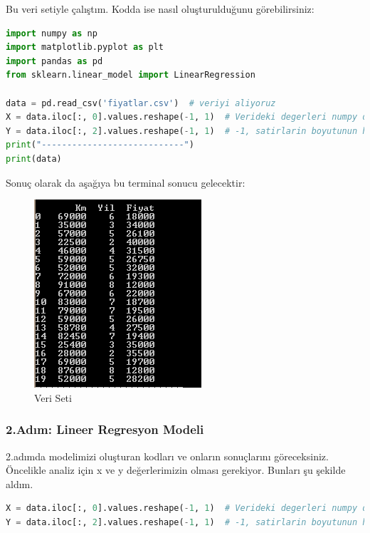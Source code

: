 \documentclass{article}
\begin{document}
\newpage

Bu veri setiyle çalıştım. Kodda ise nasıl oluşturulduğunu görebilirsiniz:

\begin{lstlisting}[language=Python, caption=Veri Seti Oluşturma]
import numpy as np
import matplotlib.pyplot as plt 
import pandas as pd
from sklearn.linear_model import LinearRegression

data = pd.read_csv('fiyatlar.csv')  # veriyi aliyoruz
X = data.iloc[:, 0].values.reshape(-1, 1)  # Verideki degerleri numpy dizisine donduruyoruz
Y = data.iloc[:, 2].values.reshape(-1, 1)  # -1, satirlarin boyutunun hesaplandigi, ancak 1 sutun oldugu anlamina gelir
print("----------------------------")
print(data)
\end{lstlisting}
Sonuç olarak da aşağıya bu terminal sonucu gelecektir:
\begin{figure}[htp]
    \centering
    \includegraphics{liR_1.png}
    \caption{Veri Seti}
    \label{fig:my_label}
\end{figure}

\subsubsection{2.Adım: Lineer Regresyon Modeli}
\hspace{1cm}2.adımda modelimizi oluşturan kodları  ve onların sonuçlarını göreceksiniz.\\
Öncelikle analiz için x ve y değerlerimizin olması gerekiyor. Bunları şu şekilde aldım.

\begin{lstlisting}[language=Python, caption=x ve y Değerleri]
X = data.iloc[:, 0].values.reshape(-1, 1)  # Verideki degerleri numpy dizisine donduruyoruz
Y = data.iloc[:, 2].values.reshape(-1, 1)  # -1, satirlarin boyutunun hesaplandigi, ancak 1 sutun oldugu anlamina gelir
\end{lstlisting}
\end{document}

